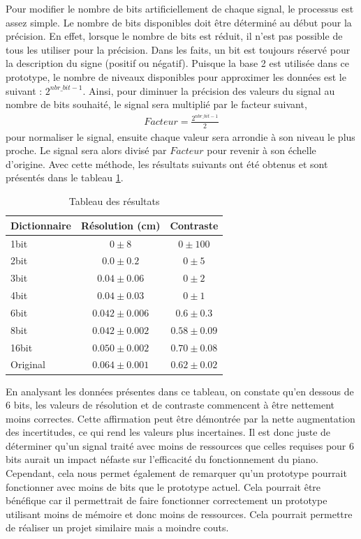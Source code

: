 \documentclass[11pt,letterpaper]{article}
\begin{document}
Pour modifier le nombre de bits artificiellement de chaque signal, le processus est assez simple.
Le nombre de bits disponibles doit être déterminé au début pour la précision. En effet, lorsque le nombre de bits est réduit,
il n'est pas possible de tous les utiliser pour la précision. Dans les faits, un bit est toujours réservé pour la description du signe (positif ou négatif).
Puisque la base 2 est utilisée dans ce prototype, le nombre de niveaux disponibles pour approximer
les données est le suivant :
$ 2^{nbr\_bit -1}$.
Ainsi, pour diminuer la précision des valeurs du signal au nombre de bits souhaité,
le signal sera multiplié par le facteur suivant, 
\begin{align}
Facteur=\frac{ 2^{nbr\_bit -1}}{2} 
\end{align}
pour normaliser le signal, ensuite chaque
valeur sera arrondie à son niveau le plus proche. Le signal sera alors divisé par
 $Facteur$ 
 pour revenir à son échelle d'origine. Avec cette méthode, les résultats suivants ont 
 été obtenus et sont présentés dans le tableau \ref{nb_bit_tab}.
\begin{table}[ht]
    \centering
    \begin{tabular}{l c c}
    \hline
    Dictionnaire & Résolution (cm) & Contraste  \\ \hline
    1bit & $0 \pm 8$ & $0 \pm 100$ \\
    2bit & $0.0 \pm 0.2$ & $0 \pm 5$ \\
    3bit & $0.04 \pm 0.06$ & $0 \pm 2$ \\
    4bit & $0.04 \pm 0.03$ & $0 \pm 1$ \\
    6bit & $0.042 \pm 0.006$ & $0.6 \pm 0.3$ \\
    8bit & $0.042 \pm 0.002$ & $0.58 \pm 0.09$ \\
    16bit & $0.050 \pm 0.002$ & $0.70 \pm 0.08$ \\
    Original & $0.064 \pm 0.001$ & $0.62 \pm 0.02$ \\
    \hline
    \end{tabular}
    \caption{Tableau des résultats }
    \label{nb_bit_tab}
  \end{table}
  
  
En analysant les données présentes dans ce tableau, on constate qu'en dessous de 6 bits,  
les valeurs de résolution et de contraste commencent à être nettement moins correctes.  
Cette affirmation peut être démontrée par la nette augmentation des incertitudes, ce qui  
rend les valeurs plus incertaines. Il est donc juste de déterminer qu'un signal traité  
avec moins de ressources que celles requises pour 6 bits aurait un impact néfaste sur  
l'efficacité du fonctionnement du piano. Cependant, cela nous permet également de remarquer  
qu'un prototype pourrait fonctionner avec moins de bits que le prototype actuel.  
Cela pourrait être bénéfique car il permettrait de faire fonctionner correctement un prototype  
utilisant moins de mémoire et donc moins de ressources. Cela pourrait permettre de réaliser un projet 
similaire mais a moindre couts. 
\end{document}

